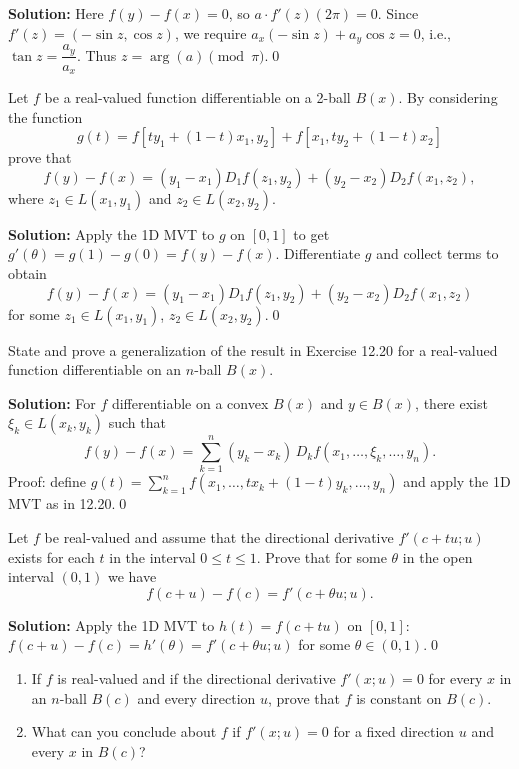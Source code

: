 \noindent\textbf{Solution:}
Here $f(y)-f(x)=0$, so $a\cdot f'(z)(2\pi)=0$. Since $f'(z)=(-\sin z,\cos z)$, we require $a_x(-\sin z)+a_y\cos z=0$, i.e., $\tan z=\dfrac{a_y}{a_x}$. Thus $z=\arg(a)\pmod{\pi}$.\qed


\begin{problembox}
Let \( f \) be a real-valued function differentiable on a 2-ball \( B(x) \). By considering the function
\[g(t) = f[ty_1 + (1 - t)x_1, y_2] + f[x_1, ty_2 + (1 - t)x_2]\]
prove that
\[f(y) - f(x) = (y_1 - x_1)D_1f(z_1, y_2) + (y_2 - x_2)D_2f(x_1, z_2),\]
where \( z_1 \in L(x_1, y_1) \) and \( z_2 \in L(x_2, y_2) \).
\end{problembox}

\noindent\textbf{Solution:}
Apply the 1D MVT to $g$ on $[0,1]$ to get $g'(\theta)=g(1)-g(0)=f(y)-f(x)$. Differentiate $g$ and collect terms to obtain
\[f(y)-f(x)=(y_1-x_1)D_1 f(z_1,y_2)+(y_2-x_2)D_2 f(x_1,z_2)\]
for some $z_1\in L(x_1,y_1)$, $z_2\in L(x_2,y_2)$.\qed


\begin{problembox}
State and prove a generalization of the result in Exercise 12.20 for a real-valued function differentiable on an \( n \)-ball \( B(x) \).
\end{problembox}

\noindent\textbf{Solution:}
For $f$ differentiable on a convex $B(x)$ and $y\in B(x)$, there exist $\xi_k\in L(x_k,y_k)$ such that
\[f(y)-f(x)=\sum_{k=1}^n (y_k-x_k)\,D_k f(x_1,\dots,\xi_k,\dots,y_n).\]
Proof: define $g(t)=\sum_{k=1}^n f(x_1,\dots,tx_k+(1-t)y_k,\dots,y_n)$ and apply the 1D MVT as in 12.20.\qed


\begin{problembox}
Let \( f \) be real-valued and assume that the directional derivative \( f'(c + tu; u) \) exists for each \( t \) in the interval \( 0 \leq t \leq 1 \). Prove that for some \( \theta \) in the open interval \( (0, 1) \) we have
\[f(c + u) - f(c) = f'(c + \theta u; u).\]
\end{problembox}

\noindent\textbf{Solution:}
Apply the 1D MVT to $h(t)=f(c+tu)$ on $[0,1]$: $f(c+u)-f(c)=h'(\theta)=f'(c+\theta u;u)$ for some $\theta\in(0,1)$.\qed


\begin{problembox}
\begin{enumerate}[label=(\alph*)]
\item If \( f \) is real-valued and if the directional derivative \( f'(x; u) = 0 \) for every \( x \) in an \( n \)-ball \( B(c) \) and every direction \( u \), prove that \( f \) is constant on \( B(c) \).
\item What can you conclude about \( f \) if \( f'(x; u) = 0 \) for a fixed direction \( u \) and every \( x \) in \( B(c) \)?
\end{enumerate}
\end{problembox}

